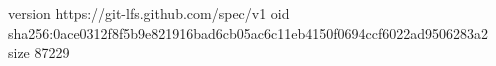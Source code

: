 version https://git-lfs.github.com/spec/v1
oid sha256:0ace0312f8f5b9e821916bad6cb05ac6c11eb4150f0694ccf6022ad9506283a2
size 87229
